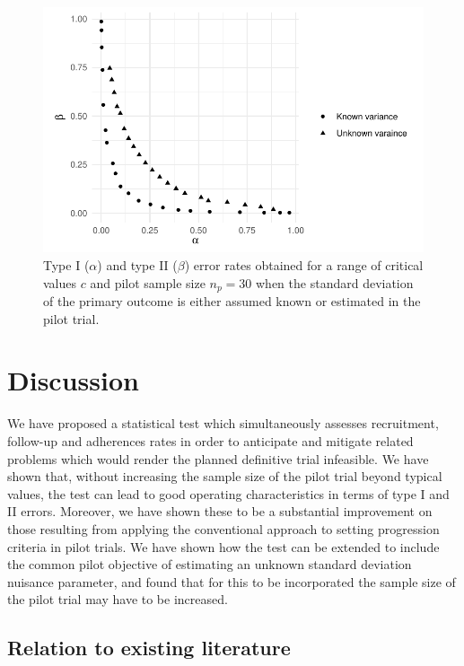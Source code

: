 \documentclass[AMA,STIX1COL]{WileyNJD-v2}
\begin{document}
\begin{figure}
\centering
\includegraphics[scale=0.8]{./Figures/unknown_var.pdf}
\caption{Type I ($\alpha$) and type II ($\beta$) error rates obtained for a range of critical values $c$ and pilot sample size $n_p = 30$ when the standard deviation of the primary outcome is either assumed known or estimated in the pilot trial.}
\label{fig:unknown_var}
\end{figure}

\section{Discussion}

We have proposed a statistical test which simultaneously assesses recruitment, follow-up and adherences rates in order to anticipate and mitigate related problems which would render the planned definitive trial infeasible. We have shown that, without increasing the sample size of the pilot trial beyond typical values, the test can lead to good operating characteristics in terms of type I and II errors. Moreover, we have shown these to be a substantial improvement on those resulting from applying the conventional approach to setting progression criteria in pilot trials. We have shown how the test can be extended to include the common pilot objective of estimating an unknown standard deviation nuisance parameter, and found that for this to be incorporated the sample size of the pilot trial may have to be increased.

\subsection{Relation to existing literature}
\end{document}
